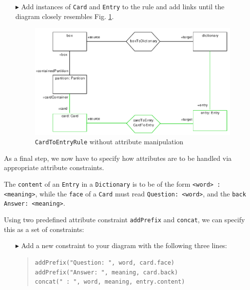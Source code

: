 \begin{enumerate}
  \item[$\blacktriangleright$] Add instances of \texttt{Card} and \texttt{Entry} to the rule and add links until the diagram closely resembles Fig. \ref{fig:cardtoentry_1}.

  \begin{figure}[htbp]
  \begin{center}
    \includegraphics[width=\textwidth]{pics/tggBilder/tggRule/tgg19}
    \caption{\texttt{CardToEntryRule} without attribute manipulation}
    \label{fig:cardtoentry_1}
  \end{center}
  \end{figure}

\end{enumerate}


As a final step, we now have to specify how attributes are to be handled via appropriate attribute constraints.

The \texttt{content} of an \texttt{Entry} in a \texttt{Dictionary} is to be of the form \texttt{<word> : <meaning>}, while the \texttt{face} of a \texttt{Card} must read \texttt{Question: <word>}, and the \texttt{back} \texttt{Answer: <meaning>}.

Using two predefined attribute constraint \texttt{addPrefix} and \texttt{concat}, we can specify this as a set of constraints:

\begin{enumerate}
\item[$\blacktriangleright$] Add a new constraint to your diagram with the following three lines:
\begin{quotation}
\noindent \texttt{addPrefix("Question: ", word, card.face)}\\
\texttt{addPrefix("Answer: ", meaning, card.back)}\\
\texttt{concat("~:~", word, meaning, entry.content)}
\end{quotation}

\end{enumerate}

